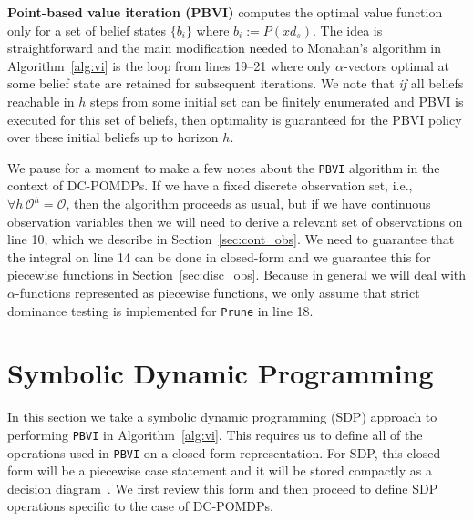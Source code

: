 \documentclass{article} %
\begin{document}
\textbf{Point-based value iteration (PBVI)} computes the optimal value function only for a set of belief states $\{ b_i \}$ where $b_i := P(xd_s)$.  The idea is straightforward and the main modification needed to Monahan's algorithm in Algorithm~\ref{alg:vi} is the loop from lines 19--21 where only $\alpha$-vectors optimal at some belief state are retained for subsequent iterations.  We note that \emph{if} all beliefs reachable in $h$ steps from some initial set can be finitely enumerated and PBVI is executed for this set of beliefs, then optimality is guaranteed for the PBVI policy over these initial beliefs up to horizon $h$.  

We pause for a moment to make a few notes about the \texttt{PBVI}
algorithm in the context of DC-POMDPs.  If we have a fixed discrete
observation set, i.e., $\forall h \, \mathcal{O}^h = \mathcal{O}$, then
the algorithm proceeds as usual, but if we have continuous observation
variables then we will need to derive a relevant set of observations
on line 10, which we describe in Section~\ref{sec:cont_obs}.  We need
to guarantee that the integral on line 14 can be done in closed-form
and we guarantee this for piecewise functions in
Section~\ref{sec:disc_obs}.  Because in general we will deal with
$\alpha$-functions represented as piecewise functions, we only assume
that strict dominance testing is implemented for \texttt{Prune} in
line 18.


\section{Symbolic Dynamic Programming} 

In this section we take a symbolic dynamic programming (SDP) approach
to performing \texttt{PBVI} in Algorithm~\ref{alg:vi}.  This requires
us to define all of the operations used in \texttt{PBVI} on a
closed-form representation.  For SDP, this closed-form will be a
piecewise case statement and it will be stored compactly as a decision
diagram~\cite{sanner_uai11}.  We first review this form and then
proceed to define SDP operations specific to the case of DC-POMDPs.
\end{document}
